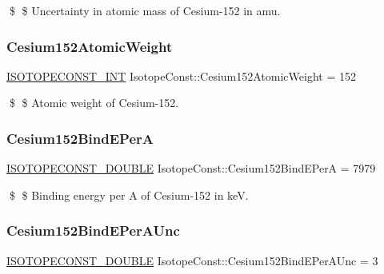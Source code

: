 \$ \$ Uncertainty in atomic mass of Cesium-\/152 in amu. \mbox{\label{group___isotope_const-_cesium-_cs152_ga02f02883b1bd235858d72af7c1fd4f49}} 
\subsubsection{\texorpdfstring{Cesium152\+Atomic\+Weight}{Cesium152AtomicWeight}}
{\footnotesize\ttfamily \mbox{\hyperlink{group___isotope_const-_macros_ga5f18360b3e99483a35c32d789e62621c}{I\+S\+O\+T\+O\+P\+E\+C\+O\+N\+S\+T\+\_\+\+I\+NT}} Isotope\+Const\+::\+Cesium152\+Atomic\+Weight = 152}

\$ \$ Atomic weight of Cesium-\/152. \mbox{\label{group___isotope_const-_cesium-_cs152_ga6880e3c43e3295260767f80b0023f80a}} 
\subsubsection{\texorpdfstring{Cesium152\+Bind\+E\+PerA}{Cesium152BindEPerA}}
{\footnotesize\ttfamily \mbox{\hyperlink{group___isotope_const-_macros_ga8f45a7272ce02c0b4c65c44636ed719a}{I\+S\+O\+T\+O\+P\+E\+C\+O\+N\+S\+T\+\_\+\+D\+O\+U\+B\+LE}} Isotope\+Const\+::\+Cesium152\+Bind\+E\+PerA = 7979}

\$ \$ Binding energy per A of Cesium-\/152 in keV. \mbox{\label{group___isotope_const-_cesium-_cs152_ga0ce6722837e9324e7cec3e67023f9f0e}} 
\subsubsection{\texorpdfstring{Cesium152\+Bind\+E\+Per\+A\+Unc}{Cesium152BindEPerAUnc}}
{\footnotesize\ttfamily \mbox{\hyperlink{group___isotope_const-_macros_ga8f45a7272ce02c0b4c65c44636ed719a}{I\+S\+O\+T\+O\+P\+E\+C\+O\+N\+S\+T\+\_\+\+D\+O\+U\+B\+LE}} Isotope\+Const\+::\+Cesium152\+Bind\+E\+Per\+A\+Unc = 3}

